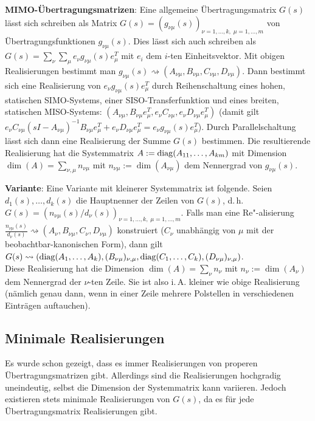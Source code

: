 \linie
\pagebreak

\textbf{MIMO-Übertragungsmatrizen}:
Eine allgemeine Übertragungsmatrix $G(s)$ lässt sich schreiben als Matrix
$G(s) = (g_{\nu\mu}(s))_{\nu=1,\dotsc,k,\;\mu=1,\dotsc,m}$ von Übertragungsfunktionen
$g_{\nu\mu}(s)$.
Dies lässt sich auch schreiben als
$G(s) = \sum_\nu \sum_\mu e_\nu g_{\nu\mu}(s) e_\mu^T$ mit $e_i$ dem $i$-ten Einheitsvektor.
Mit obigen Realisierungen bestimmt man
$g_{\nu\mu}(s) \rightsquigarrow (A_{\nu\mu}, B_{\nu\mu}, C_{\nu\mu}, D_{\nu\mu})$.
Dann bestimmt sich eine Realisierung von $e_\nu g_{\nu\mu}(s) e_\mu^T$ durch Reihenschaltung
eines hohen, statischen SIMO-Systems,
einer SISO-Transferfunktion und eines breiten, statischen MISO-Systems:
$(A_{\nu\mu}, B_{\nu\mu} e_\mu^T, e_\nu C_{\nu\mu}, e_\nu D_{\nu\mu} e_\mu^T)$
(damit gilt $e_\nu C_{\nu\mu} (sI - A_{\nu\mu})^{-1} B_{\nu\mu} e_\mu^T + e_\nu D_{\nu\mu} e_\mu^T
= e_\nu g_{\nu\mu}(s) e_\mu^T$).
Durch Parallelschaltung lässt sich dann eine Realisierung der Summe $G(s)$ bestimmen.
Die resultierende Realisierung hat die Systemmatrix $A := \operatorname{diag}(A_{11}, \dotsc, A_{km})$
mit Dimension
$\dim(A) = \sum_{\nu,\mu} n_{\nu\mu}$ mit
$n_{\nu\mu} := \dim(A_{\nu\mu})$ dem Nennergrad von $g_{\nu\mu}(s)$.

\textbf{Variante}:
Eine Variante mit kleinerer Systemmatrix ist folgende.
Seien $d_1(s), \dotsc, d_k(s)$ die Hauptnenner der Zeilen von $G(s)$, d.\,h.
$G(s) = (n_{\nu\mu}(s)/d_\nu(s))_{\nu=1,\dotsc,k,\;\mu=1,\dotsc,m}$.
Falls man eine Re"-alisierung $\frac{n_{\nu\mu}(s)}{d_\nu(s)} \rightsquigarrow
(A_\nu, B_{\nu\mu}, C_\nu, D_{\nu\mu})$ konstruiert
($C_\nu$ unabhängig von $\mu$ mit der beobachtbar-kanonischen Form), dann gilt
$G(s) \rightsquigarrow (\operatorname{diag}(A_1, \dotsc, A_k), (B_{\nu\mu})_{\nu,\mu},
\operatorname{diag}(C_1, \dotsc, C_k), (D_{\nu\mu})_{\nu,\mu})$.\\
Diese Realisierung hat die Dimension
$\dim(A) = \sum_\nu n_\nu$ mit
$n_\nu := \dim(A_\nu)$ dem Nennergrad der $\nu$-ten Zeile.
Sie ist also i.\,A. kleiner wie obige Realisierung
(nämlich genau dann, wenn in einer Zeile mehrere Polstellen in verschiedenen Einträgen
auftauchen).

\subsection{%
    Minimale Realisierungen%
}

Es wurde schon gezeigt, dass es immer Realisierungen von properen Übertragungsmatrizen gibt.
Allerdings sind die Realisierungen hochgradig uneindeutig, selbst die Dimension der Systemmatrix
kann variieren.
Jedoch existieren stets minimale Realisierungen von $G(s)$, da es für jede Übertragungsmatrix
Realisierungen gibt.

